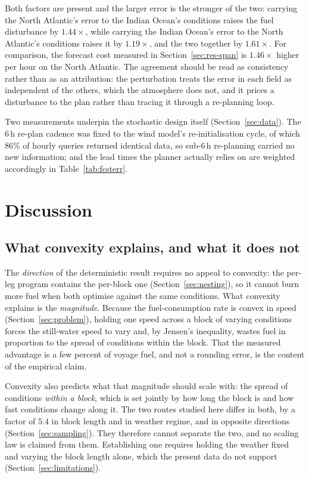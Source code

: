 \documentclass[review,authoryear]{elsarticle}
\begin{document}
Both factors are present and the larger error is the stronger of the two: carrying the North
Atlantic's error to the Indian Ocean's conditions raises the fuel disturbance by
$1.44\times$, while carrying the Indian Ocean's error to the North Atlantic's conditions raises it by
$1.19\times$, and the two together by $1.61\times$. For comparison, the forecast cost measured in
Section~\ref{sec:res-span} is $1.46\times$ higher per hour on the North Atlantic. The agreement
should be read as consistency rather than as an attribution: the perturbation treats the error in
each field as independent of the others, which the atmosphere does not, and it prices a disturbance
to the plan rather than tracing it through a re-planning loop.

Two measurements underpin the stochastic design itself (Section~\ref{sec:data}). The 6\,h re-plan
cadence was fixed to the wind model's re-initialisation cycle, of which 86\% of hourly queries
returned identical data, so sub-6\,h re-planning carried no new information; and the lead times the
planner actually relies on are weighted accordingly in Table~\ref{tab:fcsterr}.

\section{Discussion}
\label{sec:discussion}

\subsection{What convexity explains, and what it does not}
The \emph{direction} of the deterministic result requires no appeal to convexity: the per-leg
program contains the per-block one (Section~\ref{sec:nesting}), so it cannot burn more fuel when both
optimise against the same conditions. What convexity explains is the \emph{magnitude}. Because the
fuel-consumption rate is convex in speed (Section~\ref{sec:problem}), holding one speed across a block
of varying conditions forces the still-water speed to vary and, by Jensen's inequality, wastes fuel in
proportion to the spread of conditions within the block. That the measured advantage is a few percent
of voyage fuel, and not a rounding error, is the content of the empirical claim.

Convexity also predicts what that magnitude should scale with: the spread of conditions \emph{within a
block}, which is set jointly by how long the block is and how fast conditions change along it. The two
routes studied here differ in both, by a factor of $5.4$ in block length and in weather regime, and in
opposite directions (Section~\ref{sec:sampling}). They therefore cannot separate the two, and no
scaling law is claimed from them. Establishing one requires holding the weather fixed and varying the
block length alone, which the present data do not support (Section~\ref{sec:limitations}).
\end{document}
